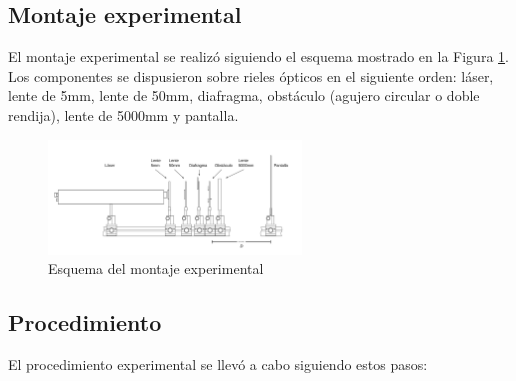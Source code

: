 \documentclass[twocolumn,a4paper,11pt]{scrartcl}
\begin{document}
\subsection{Montaje experimental}
El montaje experimental se realizó siguiendo el esquema mostrado en la Figura \ref{fig:montaje}. Los componentes se dispusieron sobre rieles ópticos en el siguiente orden: láser, lente de 5mm, lente de 50mm, diafragma, obstáculo (agujero circular o doble rendija), lente de 5000mm y pantalla.

\begin{figure}[h]
    \centering
    \includegraphics[width=0.6\textwidth]{montaje_experimental_2.png}
    \caption{Esquema del montaje experimental}
    \label{fig:montaje}
\end{figure}

\subsection{Procedimiento}
El procedimiento experimental se llevó a cabo siguiendo estos pasos:
\end{document}
